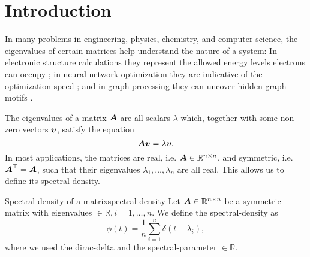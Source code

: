 \chapter{Introduction}
\label{chp:1-introduction}

In many problems in engineering, physics, chemistry, and computer science, 
the eigenvalues of certain matrices help understand the nature of a system:
In electronic structure calculations they represent the allowed energy levels 
electrons can occupy \cite{ducastelle1970charge, haydock1972electronic, lin2017randomized};
in neural network optimization they are indicative of the optimization speed \cite{ghorbani2019investigation,chen2021slq,adepu2021hessian};
and in graph processing they can uncover hidden graph motifs \cite{kruzick2018graph,huang2021kernels,patane2022filter}.\\

The eigenvalues of a matrix $\boldsymbol{A}$ are all scalars $\lambda$ which, together
with some non-zero vectors $\boldsymbol{v}$, satisfy the equation
\begin{equation}
    \boldsymbol{A} \boldsymbol{v} = \lambda \boldsymbol{v}.
    \label{equ:1-introduction-eigenvalue}
\end{equation}
In most applications, the matrices are real, i.e. $\boldsymbol{A} \in \mathbb{R}^{n \times n}$,
and symmetric, i.e. $\boldsymbol{A}^{\top} = \boldsymbol{A}$, such that their eigenvalues 
$\lambda_1, \dots, \lambda_n$ are all real. This allows us to define its
spectral density.

\begin{definition}{Spectral density of a matrix}{spectral-density}
    Let $\boldsymbol{A} \in \mathbb{R}^{n \times n}$ be a symmetric matrix with \glspl{eigenvalue}
    $\in \mathbb{R}, i=1, \dots, n$. We define the \gls{spectral-density} as
    \begin{equation}
        \phi(t) = \frac{1}{n} \sum_{i=1}^{n} \delta(t - \lambda_i),
        \label{equ:1-introduction-def-spectral-density}
    \end{equation}
    where we used the \gls{dirac-delta} \cite[chapter~15]{dirac1947quantum}
    and the \gls{spectral-parameter} $\in \mathbb{R}$.
\end{definition}

